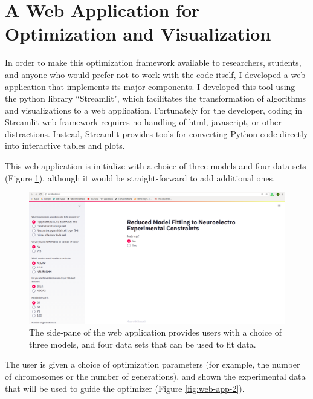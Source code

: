 \section{A Web Application for Optimization and Visualization}
\label{sec:web-app}
In order to make this optimization framework available to researchers, students, and anyone who would prefer not to work with the code itself, I developed a web application that implements its major components.
I developed this tool using the python library ``Streamlit", which facilitates the transformation of algorithms and visualizations to a web application.
Fortunately for the developer, coding in Streamlit web framework requires no handling of html, javascript, or other distractions.
Instead, Streamlit provides tools for converting Python code directly into interactive tables and plots.

This web application is initialize with a choice of three models and four data-sets (Figure \ref{fig:web-app-1}), although it would be straight-forward to add additional ones.

\begin{figure}
\begin{center}
\includegraphics[scale=1]{chapters/app_tex/web_app_thesis}
\caption[Web application (1)]{The side-pane of the web application provides users with a choice of three models, and four data sets that can be used to fit data.
}
\end{center}
\label{fig:web-app-1}
\end{figure}

The user is given a choice of optimization parameters (for example, the number of chromosomes or the number of generations), and shown the experimental data that will be used to guide the optimizer (Figure \ref{fig:web-app-2}).


